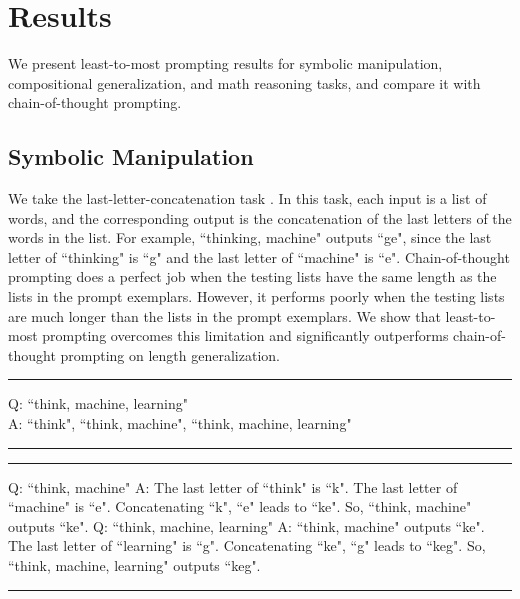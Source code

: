 \documentclass{article}
\begin{document}
\section{Results}
We present least-to-most prompting results for symbolic manipulation, compositional generalization, and math reasoning tasks, and compare it with chain-of-thought prompting. %

\subsection{Symbolic Manipulation}
\label{sec:symbolic_manipulation}
We take the last-letter-concatenation task \citep{wei2022chain}.  In this task, each input is a list of words, and the corresponding output is the concatenation of the last letters of the words in the list. For example, ``thinking, machine" outputs ``ge", since the last letter of ``thinking" is ``g" and the last letter of ``machine" is ``e". Chain-of-thought prompting does a perfect job when the testing lists have the same length as the lists in the prompt exemplars. However, it performs poorly when the testing lists are much longer than the lists in the prompt exemplars. We show that least-to-most prompting overcomes this limitation and significantly outperforms chain-of-thought prompting on length generalization.

\begin{table}[h!]
\centering
\hrule
\parbox{\textwidth}{
\vspace{5pt}
        Q: ``think, machine, learning"\\ 
        A: ``think", ``think, machine", ``think, machine, learning"
\vspace{2pt}
}
\hrule
\vspace{5pt}
\caption {Least-to-most prompt context (decomposition) for the last-letter-concatenation task. It can decompose arbitrary long lists into sequential subsists with an accuracy of 100\%.}
\label{table:l2m-last-letter-decomp}
\end{table}

\begin{table}[h!]
\centering
\hrule
\parbox{\textwidth}{
\vspace{5pt}
        Q: ``think, machine"\newline
        A: The last letter of ``think" is ``k". The last letter of ``machine" is ``e". Concatenating ``k", ``e" leads to ``ke". So, {``think, machine" outputs ``ke".} \newline
        \newline
        Q: ``think, machine, learning"
        \newline
        A: {``think, machine" outputs ``ke".}  The last letter of ``learning" is ``g". Concatenating ``ke", ``g" leads to ``keg". So, ``think, machine, learning" outputs ``keg".
\vspace{2pt}
}
\hrule
\vspace{5pt}
\caption {Least-to-most prompt context (solution) for the last-letter-concatenation task. The two exemplars in this prompt actually demonstrate a base case and a recursive step.}
\label{table:l2m-last-letter-solve}
\end{table}
\end{document}
